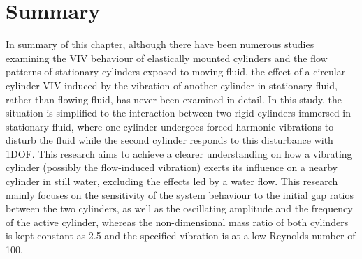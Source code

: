 \section{Summary}

In summary of this chapter, although there have been numerous studies examining the VIV behaviour of elastically mounted cylinders and the flow patterns of stationary cylinders exposed to moving fluid, the effect of a circular cylinder-VIV induced by the vibration of another cylinder in stationary fluid, rather than flowing fluid, has never been examined in detail. In this study, the situation is simplified to the interaction between two rigid cylinders immersed in stationary fluid, where one cylinder undergoes forced harmonic vibrations to disturb the fluid while the second cylinder responds to this disturbance with 1DOF. This research aims to achieve a clearer understanding on how a vibrating cylinder (possibly the flow-induced vibration) exerts its influence on a nearby cylinder in still water, excluding the effects led by a water flow. This research mainly focuses on the sensitivity of the system behaviour to the initial gap ratios between the two cylinders, as well as the oscillating amplitude and the frequency of the active cylinder, whereas the non-dimensional mass ratio of both cylinders is kept constant as 2.5 and the specified vibration is at a low Reynolds number of 100. 
%
%
%
%
